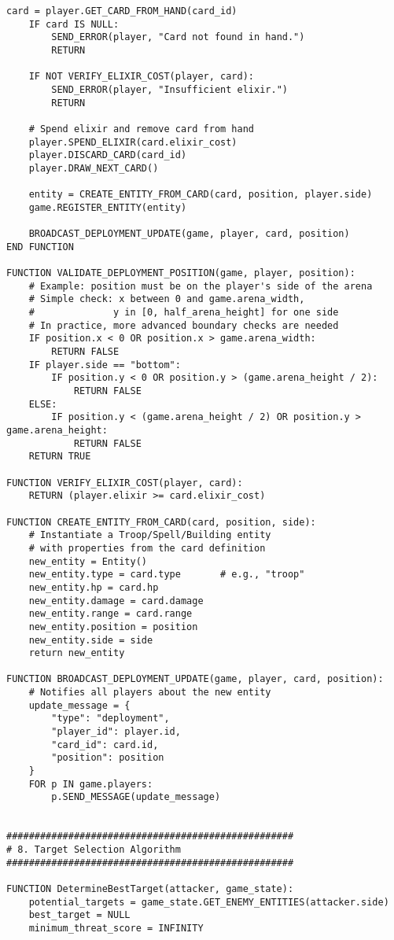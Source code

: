 \documentclass{article}
\begin{document}
\begin{lstlisting}[style=pseudo]
    card = player.GET_CARD_FROM_HAND(card_id)
    IF card IS NULL:
        SEND_ERROR(player, "Card not found in hand.")
        RETURN

    IF NOT VERIFY_ELIXIR_COST(player, card):
        SEND_ERROR(player, "Insufficient elixir.")
        RETURN

    # Spend elixir and remove card from hand
    player.SPEND_ELIXIR(card.elixir_cost)
    player.DISCARD_CARD(card_id)
    player.DRAW_NEXT_CARD()

    entity = CREATE_ENTITY_FROM_CARD(card, position, player.side)
    game.REGISTER_ENTITY(entity)

    BROADCAST_DEPLOYMENT_UPDATE(game, player, card, position)
END FUNCTION

FUNCTION VALIDATE_DEPLOYMENT_POSITION(game, player, position):
    # Example: position must be on the player's side of the arena
    # Simple check: x between 0 and game.arena_width, 
    #              y in [0, half_arena_height] for one side
    # In practice, more advanced boundary checks are needed
    IF position.x < 0 OR position.x > game.arena_width:
        RETURN FALSE
    IF player.side == "bottom":
        IF position.y < 0 OR position.y > (game.arena_height / 2):
            RETURN FALSE
    ELSE:
        IF position.y < (game.arena_height / 2) OR position.y > game.arena_height:
            RETURN FALSE
    RETURN TRUE

FUNCTION VERIFY_ELIXIR_COST(player, card):
    RETURN (player.elixir >= card.elixir_cost)

FUNCTION CREATE_ENTITY_FROM_CARD(card, position, side):
    # Instantiate a Troop/Spell/Building entity 
    # with properties from the card definition
    new_entity = Entity()
    new_entity.type = card.type       # e.g., "troop"
    new_entity.hp = card.hp
    new_entity.damage = card.damage
    new_entity.range = card.range
    new_entity.position = position
    new_entity.side = side
    return new_entity

FUNCTION BROADCAST_DEPLOYMENT_UPDATE(game, player, card, position):
    # Notifies all players about the new entity
    update_message = {
        "type": "deployment",
        "player_id": player.id,
        "card_id": card.id,
        "position": position
    }
    FOR p IN game.players:
        p.SEND_MESSAGE(update_message)


###################################################
# 8. Target Selection Algorithm
###################################################

FUNCTION DetermineBestTarget(attacker, game_state):
    potential_targets = game_state.GET_ENEMY_ENTITIES(attacker.side)
    best_target = NULL
    minimum_threat_score = INFINITY


\end{lstlisting}
\end{document}
